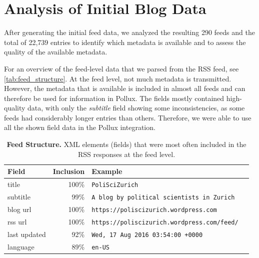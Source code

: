 \documentclass{article}
\begin{document}
\section{Analysis of Initial Blog Data}\label{sec:analysis}

After generating the initial feed data, we analyzed the resulting 290 feeds and the total of 22,739 entries to identify which metadata is available and to assess the quality of the available metadata.

For an overview of the feed-level data that we parsed from the RSS feed, see \autoref{tab:feed_structure}.
At the feed level, not much metadata is transmitted. However, the metadata that is available is included in almost all feeds and can therefore be used for information in Pollux. The fields mostly contained high-quality data, with only the \textit{subtitle} field showing some inconsistencies, as some feeds had considerably longer entries than others. Therefore, we were able to use all the shown field data in the Pollux integration.
\begin{table}[htb]
    \caption{\textbf{Feed Structure.} XML elements (fields) that were most often included in the RSS responses at the feed level.}
    \centering
    \begin{tabular}{lrl}
        \toprule
        \cmidrule(r){1-2}
        \textbf{Field} & \textbf{Inclusion} & \textbf{Example}                                   \\
        \midrule
        title          & 100\%              & \verb|PoliSciZurich                              | \\
        subtitle       & 99\%               & \verb|A blog by political scientists in Zurich   | \\
        blog url       & 100\%              & \verb|https://poliscizurich.wordpress.com        | \\
        rss url        & 100\%              & \verb|https://poliscizurich.wordpress.com/feed/  | \\
        last updated   & 92\%               & \verb|Wed, 17 Aug 2016 03:54:00 +0000            | \\
        language       & 89\%               & \verb|en-US|                                       \\
        \bottomrule
    \end{tabular}
    \label{tab:feed_structure}
\end{table}
\end{document}
